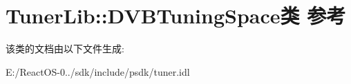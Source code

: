 \hypertarget{class_tuner_lib_1_1_d_v_b_tuning_space}{}\section{Tuner\+Lib\+:\+:D\+V\+B\+Tuning\+Space类 参考}
\label{class_tuner_lib_1_1_d_v_b_tuning_space}


该类的文档由以下文件生成\+:\begin{DoxyCompactItemize}
\item 
E\+:/\+React\+O\+S-\/0../sdk/include/psdk/tuner.\+idl\end{DoxyCompactItemize}
